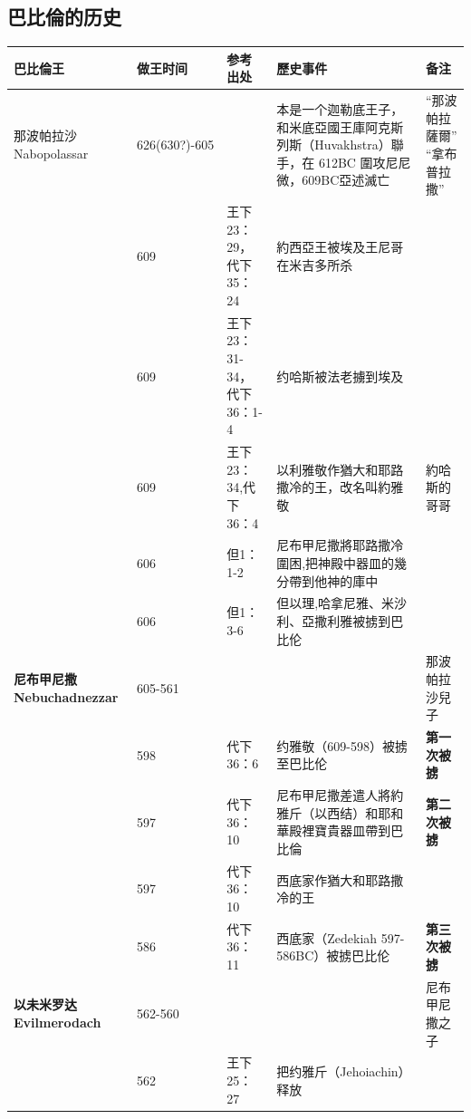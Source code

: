 \subsection{巴比倫的历史}
\begin{table}[!hbp]
\centering 
\begin{tabular}{|p{}|p{1.5cm}|p{2.5cm}|p{6.2cm}|p{2.5cm}|}
\hline
\hline
巴比倫王 & 做王时间 &参考出处 & 歷史事件 &备注 \\\hline
那波帕拉沙 Nabopolassar& 626(630?)-605& \cite{Nabopolassar} & 本是一个迦勒底王子，和米底亞國王庫阿克斯列斯（Huvakhstra）聯手，在 612BC 圍攻尼尼微，609BC亞述滅亡&“那波帕拉薩爾” “拿布普拉撒” \\\hline
&609 &王下23：29，代下35：24 & 約西亞王被埃及王尼哥在米吉多所杀& \\\hline
&609 &王下23：31-34，代下36：1-4 & 约哈斯被法老擄到埃及& \\\hline
&609 & 王下23：34,代下36：4& 以利雅敬作猶大和耶路撒冷的王，改名叫約雅敬&約哈斯的哥哥 \\\hline
&606& 但1：1-2&尼布甲尼撒將耶路撒冷圍困,把神殿中器皿的幾分帶到他神的庫中&\\\hline
&606 & 但1：3-6&但以理,哈拿尼雅、米沙利、亞撒利雅被掳到巴比伦&\\\hline
\textbf{尼布甲尼撒 Nebuchadnezzar}& 605-561&  & & 那波帕拉沙兒子 \\\hline
& 598 & 代下36：6 & 约雅敬（609-598）被掳至巴比伦 & \textcolor[rgb]{0,.1,1}{\textbf{第一次被掳}}\\\hline
& 597 &  代下36：10& 尼布甲尼撒差遣人將約雅斤（以西结）和耶和華殿裡寶貴器皿帶到巴比倫 &\textcolor[rgb]{0,.1,1}{\textbf{第二次被掳}} \\\hline
& 597 & 代下36：10& 西底家作猶大和耶路撒冷的王 & \\\hline
&586 & 代下36：11& 西底家（Zedekiah 597-586BC）被掳巴比伦&\textcolor[rgb]{0,.1,1}{\textbf{第三次被掳}}\\\hline
\textbf{以未米罗达 Evilmerodach}& 562-560 && & 尼布甲尼撒之子\\\hline
	&562	&	王下25：27&	把约雅斤（Jehoiachin）释放& \\\hline


\end{tabular}
\end{table}
